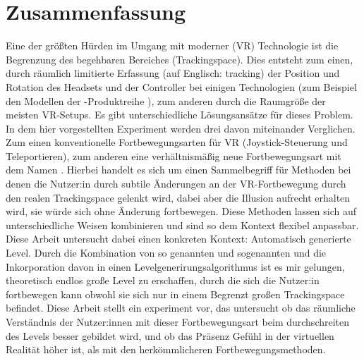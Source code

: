 \chapter*{Zusammenfassung}
Eine der größten Hürden im Umgang mit moderner  (VR) Technologie ist die Begrenzung des begehbaren Bereiches (Trackingspace). Dies entsteht zum einen, durch räumlich limitierte Erfassung (auf Englisch: tracking) der Position und Rotation des Headsets und der Controller bei einigen Technologien (zum Beispiel den Modellen der -Produktreihe
), zum anderen durch die Raumgröße der meisten VR-Setups. Es gibt unterschiedliche Lösungsansätze für dieses Problem. In dem hier vorgestellten Experiment werden drei davon miteinander Verglichen. Zum einen konventionelle Fortbewegungsarten für VR (Joystick-Steuerung und Teleportieren), zum anderen eine verhältnismäßig neue Fortbewegungsart mit dem Namen . Hierbei handelt es sich um einen Sammelbegriff für Methoden bei denen die Nutzer:in durch subtile Änderungen an der VR-Fortbewegung durch den realen Trackingspace gelenkt wird, dabei aber die Illusion aufrecht erhalten wird, sie würde sich ohne Änderung fortbewegen. Diese Methoden lassen sich auf unterschiedliche Weisen kombinieren und sind so dem Kontext flexibel anpassbar. Diese Arbeit untersucht dabei einen konkreten Kontext: Automatisch generierte Level. Durch die Kombination von so genannten  und sogenannten  und die Inkorporation davon in einen Levelgenerirungsalgorithmus ist es mir gelungen, theoretisch endlos große Level zu erschaffen, durch die sich die Nutzer:in fortbewegen kann obwohl sie sich nur in einem Begrenzt großen Trackingspace befindet. Diese Arbeit stellt ein experiment vor, das untersucht ob das räumliche Verständnis der Nutzer:innen mit dieser Fortbewegungsart beim durchschreiten des Levels besser gebildet wird, und ob das Präsenz Gefühl in der virtuellen Realität höher ist, als mit den herkömmlicheren Fortbewegungsmethoden.



